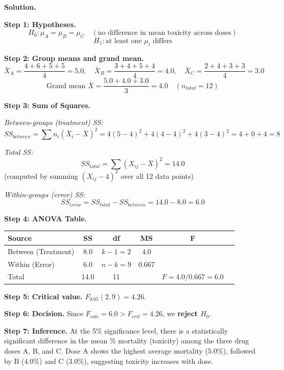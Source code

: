 \documentclass[11pt]{article}
\newcommand{\soln}{\par\noindent\textcolor{acolor}{\textbf{Solution.}}\quad}
\begin{document}
\soln

\textbf{Step 1: Hypotheses.}
\[
H_0: \mu_A = \mu_B = \mu_C \quad (\text{no difference in mean toxicity across doses})
\]
\[
H_1: \text{at least one } \mu_i \text{ differs}
\]

\textbf{Step 2: Group means and grand mean.}
\[
\bar{X}_A = \frac{4+6+5+5}{4}=5.0, \quad \bar{X}_B = \frac{3+4+5+4}{4}=4.0, \quad \bar{X}_C = \frac{2+4+3+3}{4}=3.0
\]
\[
\text{Grand mean } \bar{X} = \frac{5.0+4.0+3.0}{3} = 4.0 \quad (n_{total}=12)
\]

\textbf{Step 3: Sum of Squares.}

\emph{Between-groups (treatment) SS:}
\[
SS_{between} = \sum n_i(\bar{X}_i - \bar{X})^2 = 4(5-4)^2+4(4-4)^2+4(3-4)^2 = 4+0+4 = 8
\]

\emph{Total SS:}
\[
SS_{total} = \sum (X_{ij}-\bar{X})^2 = 14.0
\]
(computed by summing $(X_{ij}-4)^2$ over all 12 data points)

\emph{Within-groups (error) SS:}
\[
SS_{error} = SS_{total} - SS_{between} = 14.0 - 8.0 = 6.0
\]

\textbf{Step 4: ANOVA Table.}

\begin{center}
\begin{tabular}{lccccc}
\toprule
Source & SS & df & MS & F \\
\midrule
Between (Treatment) & 8.0 & $k-1=2$ & 4.0 & \\
Within (Error)      & 6.0 & $n-k=9$ & 0.667 & \\
\midrule
Total & 14.0 & 11 & & $F = 4.0/0.667 = 6.0$ \\
\bottomrule
\end{tabular}
\end{center}

\textbf{Step 5: Critical value.} $F_{0.05}(2,9) = 4.26$.

\textbf{Step 6: Decision.} Since $F_{calc} = 6.0 > F_{crit} = 4.26$, we \textbf{reject $H_0$}.

\textbf{Step 7: Inference.} At the 5\% significance level, there is a statistically significant difference in the mean \% mortality (toxicity) among the three drug doses A, B, and C. Dose A shows the highest average mortality (5.0\%), followed by B (4.0\%) and C (3.0\%), suggesting toxicity increases with dose.
\end{document}
